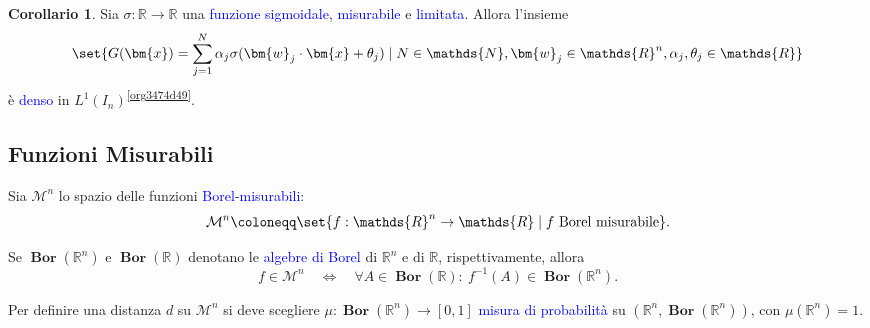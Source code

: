 \documentclass[10pt]{book}
\newcommand{\1}{\mathds{1}}
\newcommand{\R}{\mathds{R}}
\newcommand{\N}{\mathds{N}}
\theoremstyle{definition}%
\newtheorem{cor}[thm]{Corollario}
\theoremstyle{plain}
\theoremstyle{remark}
\renewcommand{\href}[2]{\textcolor{blue}{#2}}
\begin{document}
\begin{cor}
Sia \(\sigma:\R\to\R\) una \href{../../../../../org/roam/20250202170607-classe_relazione_binaria.org}{funzione} \href{../../../../../org/roam/20250625110110-funzione_sigmoidale.org}{sigmoidale}, \href{../../../../../org/roam/20250704104947-funzione_misurabile.org}{misurabile} e \href{../../../../../org/roam/20250704145518-funzione_limitata.org}{limitata}. Allora l'insieme
\begin{equation*}
\set{
G(\bm{x}) = \sum_{j=1}^{N}\alpha_{j}\sigma(\bm{w}_{j}\cdot \bm{x} + \theta_{j})\mid N \in \N, \bm{w}_{j} \in \R^{n}, \alpha_{j},\theta_{j} \in \R
}
\end{equation*}
è \href{../../../../../org/roam/20250301193045-sottoinsieme_denso.org}{denso} in \(L^{1}(I_{n})\)\textsuperscript{\ref{org3474d49}}.
\label{thm9.3.18}
\end{cor}
\subsection{Funzioni Misurabili}
\label{sec:org9380741}

Sia \(\mathcal{M}^{n}\) lo spazio delle funzioni \href{../../../../../org/roam/20250704104938-algebra_di_borel.org}{Borel}-\href{../../../../../org/roam/20250704104947-funzione_misurabile.org}{misurabili}:
\begin{equation*}
\mathcal{M}^{n}\coloneqq \set{f:\R^{n}\to \R\mid f\text{ Borel misurabile}}.
\end{equation*}

Se \(\bm{{\operatorname{Bor}}}(\R^{n})\) e \(\bm{{\operatorname{Bor}}}(\R)\) denotano le \href{../../../../../org/roam/20250704104938-algebra_di_borel.org}{algebre di Borel} di \(\R^{n}\) e di \(\R\), rispettivamente, allora
\begin{equation*}
f \in \mathcal{M}^{n}\quad \iff\quad \forall A \in \bm{{\operatorname{Bor}}}(\R): \ f^{-1}(A) \in \bm{{\operatorname{Bor}}}(\R^{n}).
\end{equation*}

Per definire una distanza \(d\) su \(\mathcal{M}^{n}\) si deve scegliere \(\mu:\bm{{\operatorname{Bor}}}(\R^{n})\to [0,1]\) \href{../../../../../org/roam/20250704105515-misura_di_probabilita.org}{misura di probabilità} su \(\left(\R^{n}, \bm{{\operatorname{Bor}}}(\R^{n})\right)\), con \(\mu(\R^{n})=1\).
\end{document}
